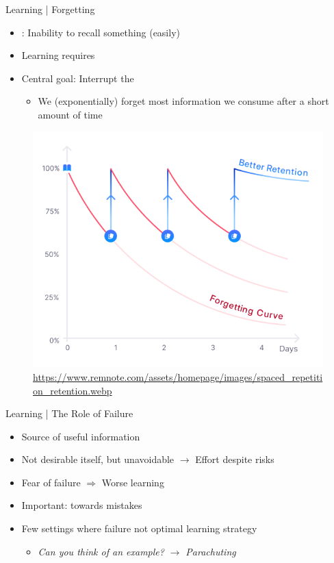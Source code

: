\documentclass{ercisbeamer}
\begin{document}
\begin{frame}{Learning | Forgetting}
    \begin{itemize}
        \item {}: Inability to recall something (easily)
        \item Learning requires 
        \item Central goal: Interrupt the 
        \begin{itemize}
            \item We (exponentially) forget most information we consume after a short amount of time
        \end{itemize}
    \end{itemize}

    \begin{figure}
        \centering
        \includegraphics[width=0.35\paperwidth]{04_resources/forgetting_curve_remnote.png}
        \vspace{-0.5em}
        \caption{\tiny \url{https://www.remnote.com/assets/homepage/images/spaced_repetition_retention.webp}}
    \end{figure}
\end{frame}

\begin{frame}{Learning | The Role of Failure}
    \begin{itemize}
        \item Source of useful information
        \item Not desirable itself, but unavoidable $\rightarrow$ Effort despite risks
        \item Fear of failure $\Rightarrow$ Worse learning
        \item Important:  towards mistakes
        \item Few settings where failure not optimal learning strategy
        \begin{itemize}
            \item \emph{Can you think of an example?} \pause \emph{$\rightarrow$ Parachuting}
        \end{itemize}
    \end{itemize}
\end{frame}
\end{document}
